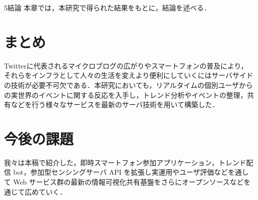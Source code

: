 \chapterhead
{5}{結論}
{本章では，本研究で得られた結果をもとに，結論を述べる．}

\section{まとめ}
Twitterに代表されるマイクロブログの広がりやスマートフォンの普及により，それらをインフラとして人々の生活を変えより便利にしていくにはサーバサイドの技術が必要不可欠である．本研究においても，リアルタイムの個別ユーザからの実世界のイベントに関する反応を入手し，トレンド分析やイベントの整理，共有などを行う様々なサービスを最新のサーバ技術を用いて構築した．

\section{今後の課題}
我々は本稿で紹介した，即時スマートフォン参加アプリケーション，トレンド配信 bot，参加型センシングサーバ API を拡張し実運用やユーザ評価などを通して Web サービス群の最新の情報可視化共有基盤をさらにオープンソースなどを通じて広めていく．
